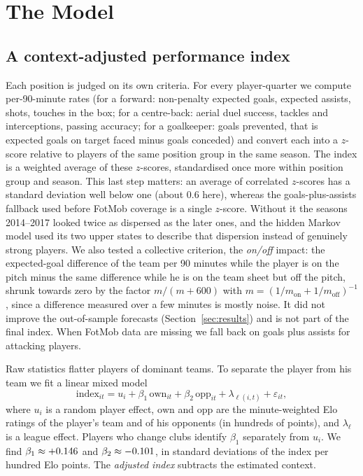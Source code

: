 \documentclass[11pt]{amsart}
\theoremstyle{definition}
\theoremstyle{remark}
\begin{document}
\section{The Model}\label{sec:model}

\subsection{A context-adjusted performance index}
Each position is judged on its own criteria. For every player-quarter we compute per-90-minute rates (for a forward: non-penalty expected goals, expected assists, shots, touches in the box; for a centre-back: aerial duel success, tackles and interceptions, passing accuracy; for a goalkeeper: goals prevented, that is expected goals on target faced minus goals conceded) and convert each into a $z$-score relative to players of the same position group in the same season. The index is a weighted average of these $z$-scores, standardised once more within position group and season. This last step matters: an average of correlated $z$-scores has a standard deviation well below one (about $0.6$ here), whereas the goals-plus-assists fallback used before FotMob coverage is a single $z$-score. Without it the seasons 2014--2017 looked twice as dispersed as the later ones, and the hidden Markov model used its two upper states to describe that dispersion instead of genuinely strong players. We also tested a collective criterion, the \emph{on/off} impact: the expected-goal difference of the team per 90 minutes while the player is on the pitch minus the same difference while he is on the team sheet but off the pitch, shrunk towards zero by the factor $m/(m+600)$ with $m=(1/m_{\text{on}}+1/m_{\text{off}})^{-1}$, since a difference measured over a few minutes is mostly noise. It did not improve the out-of-sample forecasts (Section~\ref{sec:results}) and is not part of the final index. When FotMob data are missing we fall back on goals plus assists for attacking players.

Raw statistics flatter players of dominant teams. To separate the player from his team we fit a linear mixed model
\[
\text{index}_{it} = u_i + \beta_1\,\text{own}_{it} + \beta_2\,\text{opp}_{it} + \lambda_{\ell(i,t)} + \varepsilon_{it},
\]
where $u_i$ is a random player effect, $\text{own}$ and $\text{opp}$ are the minute-weighted Elo ratings of the player's team and of his opponents (in hundreds of points), and $\lambda_\ell$ is a league effect. Players who change clubs identify $\beta_1$ separately from $u_i$. We find $\beta_1\approx+0.146$ and $\beta_2\approx-0.101$, in standard deviations of the index per hundred Elo points. The \emph{adjusted index} subtracts the estimated context.
\end{document}
